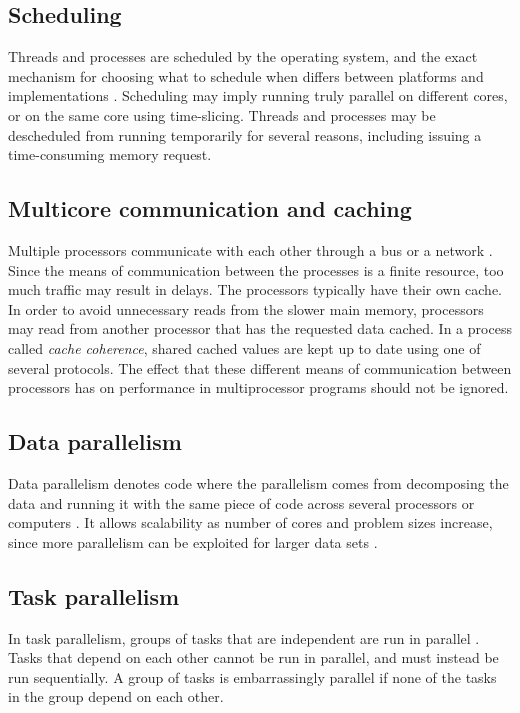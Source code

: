 \subsection{Scheduling}
Threads and processes are scheduled by the operating system, and the exact mechanism for choosing what to schedule when differs
between platforms and implementations \cite[p. 472]{herlihy_2012_art_taomprr}. Scheduling may imply running truly parallel
on different cores, or on the same core using time-slicing. Threads and processes may be descheduled from running temporarily for several
reasons, including issuing a time-consuming memory request.

\subsection{Multicore communication and caching}
Multiple processors communicate with each other through a bus or a network \cite[p. 472-476]{herlihy_2012_art_taomprr}. Since the
means of communication between the processes is a finite resource, too much traffic may result in delays. The processors typically
have their own cache. In order to avoid unnecessary reads from the slower main memory, processors may read from another processor
that has the requested data cached. In a process called \emph{cache coherence}, shared cached values are kept up to date using one
of several protocols. The effect that these different means of communication between processors has on performance in
multiprocessor programs should not be ignored.

\subsection{Data parallelism}
Data parallelism denotes code where the parallelism comes from decomposing the data and running it with the same piece of code
across several processors or computers \cite{singh_2013_parallel_padpwprfmm}. It allows scalability as number of cores and problem
sizes increase, since more parallelism can be exploited for larger data sets \cite[p. 24]{mccool_2012_structured_spppfec}.

\subsection{Task parallelism}
In task parallelism, groups of tasks that are independent are run in parallel \cite{chow_2015_pipeline_ppiaote}.
Tasks that depend on each other cannot be run in parallel, and must instead be run sequentially.
A group of tasks is embarrassingly parallel if none of the tasks in the group depend on each other.

